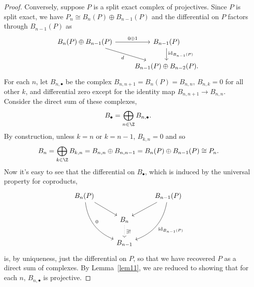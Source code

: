 \documentclass[10pt]{amsart}
\begin{document}
\begin{ex}
\begin{proof}
    Conversely, suppose $P$ is a split exact complex of projectives.
    Since $P$ is split exact, we have $P_n \cong B_n(P) \oplus B_{n-1}(P)$ and the differential on $P$ factors through $B_{n-1}(P)$ as
    $$\begin{tikzcd}
      B_n(P) \oplus B_{n-1}(P) \arrow{r}{0 \oplus 1} \arrow[swap]{rd}{d} & B_{n-1}(P) \arrow{d}{\operatorname{id}_{B_{n-1}(P)}}\\
      & B_{n-1}(P) \oplus B_{n-2}(P).
    \end{tikzcd}$$
    For each $n$, let $B_{n,\bullet}$ be the complex $B_{n,n+1} = B_n(P) = B_{n,n}$, $B_{n,k} = 0$ for all other $k$, and differential zero except for the identity map $B_{n,n+1} \rightarrow B_{n,n}$.
    Consider the direct sum of these complexes,
    $$B_\bullet = \bigoplus_{n \in \Z} B_{n,\bullet}.$$
    By construction, unless $k = n$ or $k = n - 1$, $B_{k,n} = 0$ and so
    $$B_n = \bigoplus_{k \in \Z} B_{k,n} = B_{n,n} \oplus B_{n,n-1} = B_n(P) \oplus B_{n-1}(P) \cong P_n.$$
    Now it's easy to see that the differential on $B_\bullet$, which is induced by the universal property for coproducts,
    $$\begin{tikzcd}
      B_n(P) \arrow{rd} \arrow[bend right]{rdd}{0} & & B_{n-1}(P) \arrow[bend left]{ldd}{\operatorname{id}_{B_{n-1}(P)}}\arrow{ld}\\
      & B_n \arrow[dotted]{d}{\exists !} &\\
      & B_{n-1}&
    \end{tikzcd}$$
    is, by uniqueness, just the differential on $P$, so that we have recovered $P$ as a direct sum of complexes.
    By Lemma~\ref{lem11}, we are reduced to showing that for each $n$, $B_{n,\bullet}$ is projective.


\end{proof}
\end{ex}
\end{document}
